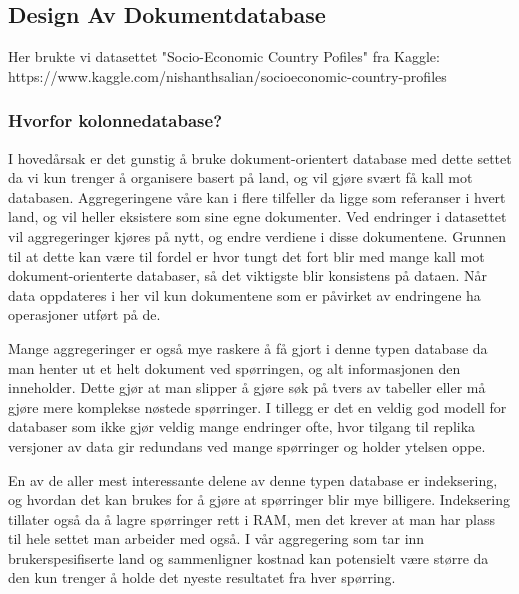 \subsection{Design Av Dokumentdatabase}
Her brukte vi datasettet "Socio-Economic Country Pofiles" fra Kaggle: https://www.kaggle.com/nishanthsalian/socioeconomic-country-profiles

\subsubsection{Hvorfor kolonnedatabase?}
I hovedårsak er det gunstig å bruke dokument-orientert database med dette settet da vi kun trenger å organisere basert på land, og vil gjøre svært få kall mot databasen. Aggregeringene våre kan i flere tilfeller da ligge som referanser i hvert land, og vil heller eksistere som sine egne dokumenter. Ved endringer i datasettet vil aggregeringer kjøres på nytt, og endre verdiene i disse dokumentene. Grunnen til at dette kan være til fordel er hvor tungt det fort blir med mange kall mot dokument-orienterte databaser, så det viktigste blir konsistens på dataen. Når data oppdateres i her vil kun dokumentene som er påvirket av endringene ha operasjoner utført på de.

Mange aggregeringer er også mye raskere å få gjort i denne typen database da man henter ut et helt dokument ved spørringen, og alt informasjonen den inneholder. Dette gjør at man slipper å gjøre søk på tvers av tabeller eller må gjøre mere komplekse nøstede spørringer. I tillegg er det en veldig god modell for databaser som ikke gjør veldig mange endringer ofte, hvor tilgang til replika versjoner av data gir redundans ved mange spørringer og holder ytelsen oppe.

En av de aller mest interessante delene av denne typen database er indeksering, og hvordan det kan brukes for å gjøre at spørringer blir mye billigere. Indeksering tillater også da å lagre spørringer rett i RAM, men det krever at man har plass til hele settet man arbeider med også. I vår aggregering som tar inn brukerspesifiserte land og sammenligner kostnad kan potensielt være større da den kun trenger å holde det nyeste resultatet fra hver spørring.

